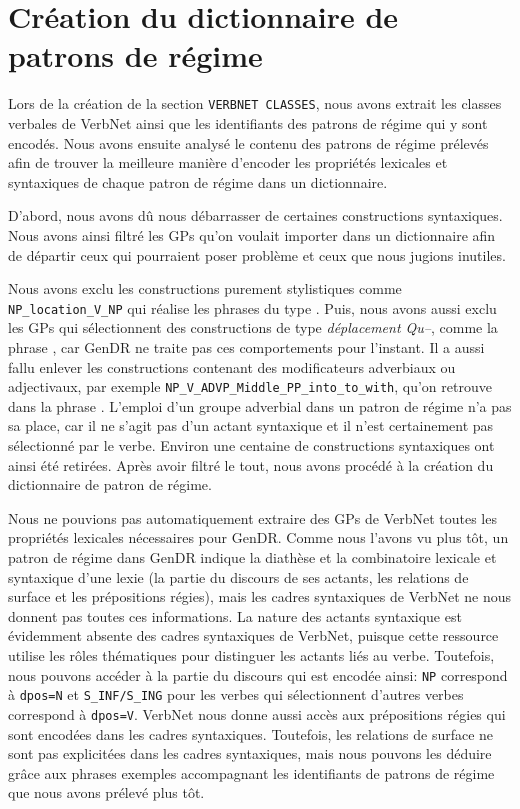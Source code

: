 \section{Création du dictionnaire de patrons de régime}\label{sec:creategpcon}

Lors de la création de la section \texttt{VERBNET CLASSES}, nous avons extrait les classes verbales de VerbNet ainsi que les identifiants des patrons de régime qui y sont encodés. Nous avons ensuite analysé le contenu des patrons de régime prélevés afin de trouver la meilleure manière d'encoder les propriétés lexicales et syntaxiques de chaque patron de régime dans un dictionnaire.

D'abord, nous avons dû nous débarrasser de certaines constructions syntaxiques. Nous avons ainsi filtré les \acp{GP} qu'on voulait importer dans un dictionnaire afin de départir ceux qui pourraient poser problème et ceux que nous jugions inutiles.

Nous avons exclu les constructions purement stylistiques comme \lstinline|NP_location_V_NP| qui réalise les phrases du type . Puis, nous avons aussi exclu les \acp{GP} qui sélectionnent des constructions de type \emph{déplacement Qu--}, comme la phrase , car GenDR ne traite pas ces comportements pour l'instant. Il a aussi fallu enlever les constructions contenant des modificateurs adverbiaux ou adjectivaux, par exemple \lstinline|NP_V_ADVP_Middle_PP_into_to_with|, qu'on retrouve dans la phrase . L'emploi d'un groupe adverbial dans un patron de régime n'a pas sa place, car il ne s'agit pas d'un actant syntaxique et il n'est certainement pas sélectionné par le verbe. Environ une centaine de constructions syntaxiques ont ainsi été retirées. Après avoir filtré le tout, nous avons procédé à la création du dictionnaire de patron de régime.

Nous ne pouvions pas automatiquement extraire des \acp{GP} de VerbNet toutes les propriétés lexicales nécessaires pour GenDR. Comme nous l'avons vu plus tôt, un patron de régime dans GenDR indique la diathèse et la combinatoire lexicale et syntaxique d'une lexie (la partie du discours de ses actants, les relations de surface et les prépositions régies), mais les cadres syntaxiques de VerbNet ne nous donnent pas toutes ces informations. La nature des actants syntaxique est évidemment absente des cadres syntaxiques de VerbNet, puisque cette ressource utilise les rôles thématiques pour distinguer les actants liés au verbe. Toutefois, nous pouvons accéder à la partie du discours qui est encodée ainsi: \texttt{NP} correspond à \texttt{dpos=N} et \texttt{S\_INF/S\_ING} pour les verbes qui sélectionnent d'autres verbes correspond à \texttt{dpos=V}. VerbNet nous donne aussi accès aux prépositions régies qui sont encodées dans les cadres syntaxiques. Toutefois, les relations de surface ne sont pas explicitées dans les cadres syntaxiques, mais nous pouvons les déduire grâce aux phrases exemples accompagnant les identifiants de patrons de régime que nous avons prélevé plus tôt.

